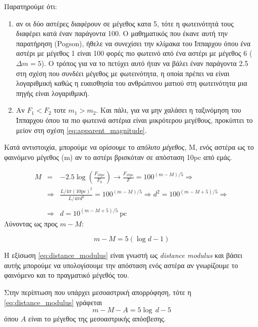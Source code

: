 Παρατηρούμε ότι:
\begin{enumerate}
    \item αν οι δύο αστέρες διαφέρουν σε μέγεθος κατα 5, τότε η φωτεινότητά τους διαφέρει κατά έναν παράγοντα 100. Ο μαθηματικός που έκανε αυτή την παρατήρηση (Pogson), ήθελε να συνεχίσει την κλίμακα του Ίππαρχου όπου ένα αστέρι με μέγεθος 1 είναι 100 φορές πιο φωτεινό από ένα αστέρι με μέγεθος 6 ($\Delta m = 5$). Ο τρόπος για να το πετύχει αυτό ήταν να βάλει έναν παράγοντα 2.5 στη σχέση που συνδέει μέγεθος με φωτεινότητα, η οποία πρέπει να είναι λογαριθμική καθώς η ευαισθησία του ανθρώπινου ματιού στη φωτεινότητα μια πηγής είναι λογαριθμική.
    \item Αν $F_1 < F_2$ τοτε $m_1 > m_2$. Και πάλι, για να μην χαλάσει η ταξινόμηση του Ίππαρχου όπου τα πιο φωτεινά αστέρια είναι μικρότερου μεγέθους, προκύπτει το μείον στη σχέση \eqref{eq:apparent_magnitude}.
\end{enumerate}

Κατά αντιστοιχία, μπορούμε να ορίσουμε το \textit{απόλυτο μέγεθος}, M, ενός αστέρα ως το φαινόμενο μέγεθος (m) αν το αστέρι βρισκόταν σε απόσταση 10pc από εμάς.

\begin{eqnarray*}
    M &=& -2.5 \log \left( \frac{F_{10 \text{pc}}}{F_0} \right) \longrightarrow \frac{F_{10 \text{pc}}}{F} = 100^{(m-M)/5} \Rightarrow \\
    &\Rightarrow & \frac{\displaystyle L/4\pi (10 \text{pc})^2}{L/4 \pi d^2} = 100^{(m-M)/5} \Rightarrow d^2 = 100^{(m-M+5)/5} \Rightarrow \\\\
    & \Rightarrow & \boxed{d = 10^{(m-M+5)/5} \ \text{pc}}
\end{eqnarray*}
Λύνοντας ως προς $m-M$:

\begin{equation}
    \label{eq:distance_modulus}
    m-M = 5(\log d - 1)
\end{equation}

Η εξίσωση \eqref{eq:distance_modulus} είναι γνωστή ως \textit{distance modulus} και βάσει αυτής μπορούμε να υπολογίσουμε την απόσταση ενός αστέρα αν γνωρίζουμε το φαινόμενο και το πραγματικό μέγεθός του.

Στην περίπτωση που υπάρχει μεσοαστρική απορρόφηση, τότε η \eqref{eq:distance_modulus} γράφεται
\begin{equation}
    m - M - A = 5\log\,d - 5
\end{equation}
όπου $A$ είναι το μέγεθος της μεσοαστρικής απόσβεσης.


